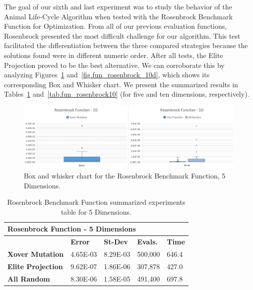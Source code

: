 \documentclass[graybox]{svmult}
\begin{document}
            The goal of our sixth and last experiment was to study the behavior
            of the Animal Life-Cycle Algorithm when tested with the Rosenbrock
            Benchmark Function for Optimization. From all of our previous
            evaluation functions, Rosenbrock presented the most difficult
            challenge for our algorithm. This test facilitated the
            differentiation between the three compared strategies because the
            solutions found were in different numeric order. After all tests,
            the Elite Projection proved to be the best alternative. We can
            corroborate this by analyzing Figures~\ref{fig.fun_rosenbrock_5d}
            and~\ref{fig.fun_rosenbrock_10d}, which shows its corresponding Box
            and Whisker chart. We present the summarized results in
            Tables~\ref{tab.fun_rosenbrock5} and~\ref{tab.fun_rosenbrock10}
            (for five and ten dimensions, respectively).

            \begin{figure}
                \includegraphics[width=0.99\linewidth, frame]{img/fig_fun_rosenbrock_5d.pdf}
                \caption{Box and whisker chart for the Rosenbrock Benchmark Function, 5 Dimensions.} \label{fig.fun_rosenbrock_5d}
                \end{figure}

            \begin{table}[]
                \scriptsize
                \centering
                \caption{Rosenbrock Benchmark Function summarized experiments table for 5 Dimensions.}\label{tab.fun_rosenbrock5}
                \begin{tabular}{@{}lllll@{}}
                \toprule
                \multicolumn{5}{l}{\textbf{Rosenbrock Function - 5 Dimensions}} \\ \midrule
                & \textbf{Error} & \textbf{St-Dev} & \textbf{Evals.} & \textbf{Time} \\
                \textbf{Xover Mutation} & 4.65E-03 & 8.29E-03 & 500,000 & 646.4 \\
                \textbf{Elite Projection} & 9.62E-07 & 1.86E-06 & 307,878 & 427.0 \\
                \textbf{All Random} & 8.30E-06 & 1.58E-05 & 491,400 & 697.8 \\ \bottomrule
                \end{tabular}
                \end{table}
\end{document}
